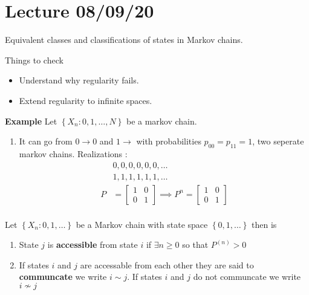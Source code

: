 \documentclass{article}
\theoremstyle{remark}
\newcommand{\newpara}
  {
  \vskip 0.4cm
  }
\begin{document}
\section{Lecture 08/09/20}%
\label{sec:lecture_08_09_20}

Equivalent classes and classifications of states in Markov chains.


\newpara
Things to check
\begin{itemize}
  \item Understand why regularity fails.
  \item Extend regularity to infinite spaces.
\end{itemize}

\textbf{Example} 
Let $\left\{ X_{n}: 0,1,\ldots,N \right\}$ be a markov chain.

\begin{enumerate}[label=(\alph*)]
  \item It can go from $0\to 0$ and $1\to $ with probabilities $p_{00} = p_{11} = 1$, two seperate markov chains. Realizations : \[
  \begin{split}
      &  0, 0,0,0,0,0,    \ldots\\
      &  1,1,1,1,1,1,  \ldots  \\
    P &= \begin{bmatrix} 
    1  &  0 \\
    0  &  1
    \end{bmatrix}  \implies  P^{n} = \begin{bmatrix} 
    1  &  0 \\
    0  &  1
    \end{bmatrix} 
     \\
  \end{split} 
  \] 
\end{enumerate}

\begin{definition}
  Let $\left\{ X_{n}: 0, 1 , \ldots \right\}$ be a Markov chain with state space $\left\{ 0, 1 , \ldots \right\}$ then is 
  \begin{enumerate}[label=(\roman*)]
    \item State $j$ is \textbf{ accessible}  from state $i $ if $\exists n \ge 0$  so that $P^{(n)} > 0$ 
    \item If states $i$ and $j$ are accessable from each other they are said to \textbf{communcate }  we write $ i \sim j$. If states $i$ and $j$ do not communcate we write $i \not \sim  j$
  \end{enumerate}
\end{definition}
\end{document}
